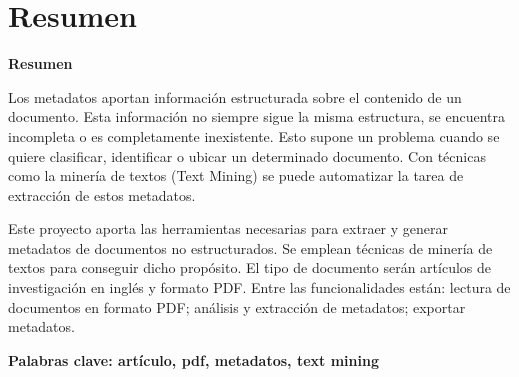 \documentclass[../main.tex]{subfiles}
\begin{document}
\makeatletter
\renewenvironment{abstract}{%
    \if@twocolumn
      \section*{Resumen \\}%
    \else %
    \begin{flushright}
        {\filleft\Huge\bfseries\fontsize{48pt}{12}\selectfont Resumen\vspace{\z@}}%
        \end{flushright}
      \quotation
    \fi}
    {\if@twocolumn\else\endquotation\fi}
\makeatother
\makeatletter
\renewenvironment{abstract}{%
    \if@twocolumn
      \section*{Resumen \\}%
    \else %
    \begin{flushright}
        {\filleft\Huge\bfseries\fontsize{48pt}{12}\selectfont Resumen\vspace{\z@}}%
        \end{flushright}
      \quotation
    \fi}
    {\if@twocolumn\else\endquotation\fi}
\makeatother
\begin{abstract}

Los metadatos aportan información estructurada sobre el contenido de un documento. Esta información no siempre sigue la misma estructura, se encuentra incompleta o es completamente inexistente. Esto supone un problema cuando se quiere clasificar, identificar o ubicar un determinado documento. Con técnicas como la minería de textos (Text Mining) se puede automatizar la tarea de extracción de estos metadatos.

Este proyecto aporta las herramientas necesarias para extraer y generar metadatos de documentos no estructurados. Se emplean técnicas de minería de textos para conseguir dicho propósito. El tipo de documento serán artículos de investigación en inglés y formato PDF. Entre las funcionalidades están: lectura de documentos en formato PDF; análisis y extracción de metadatos; exportar metadatos.

\bfseries{\large{Palabras clave:}} artículo, pdf, metadatos, text mining

\end{abstract}
\end{document}

